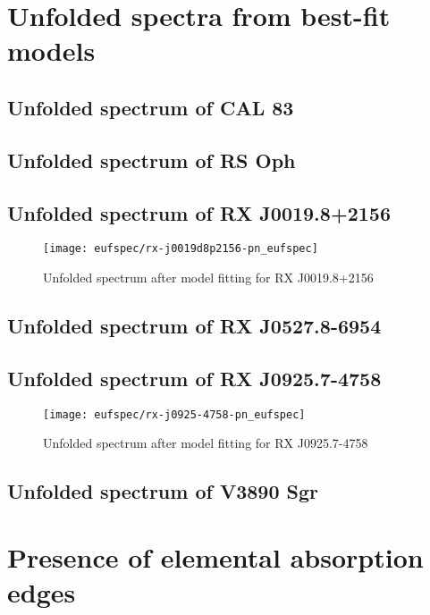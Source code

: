 	\section{Unfolded spectra from best-fit models}
	
		\subsection*{Unfolded spectrum of CAL 83}
		
		\subsection*{Unfolded spectrum of RS Oph}
		
		\subsection*{Unfolded spectrum of RX J0019.8+2156}
			\begin{figure}[h!]
				\centering
				\texttt{[image: eufspec/rx-j0019d8p2156-pn\_eufspec]}
				\caption{Unfolded spectrum after model fitting for RX J0019.8+2156}
				\label{result:euf-rx-j0019}
			\end{figure}
		
		\subsection*{Unfolded spectrum of RX J0527.8-6954}
		
		\subsection*{Unfolded spectrum of RX J0925.7-4758}
			\begin{figure}[h!]
				\centering
				\texttt{[image: eufspec/rx-j0925-4758-pn\_eufspec]}
				\caption{Unfolded spectrum after model fitting for RX J0925.7-4758}
				\label{result:euf-rx-j0925}
			\end{figure}
		
		\subsection*{Unfolded spectrum of V3890 Sgr}
	
	\newpage
	\section{Presence of elemental absorption edges}
	
